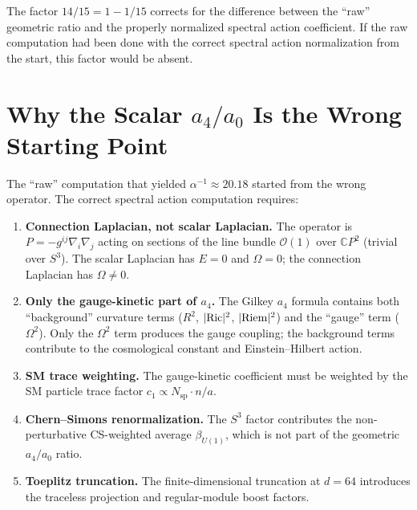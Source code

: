 \documentclass[12pt,a4paper]{article}
\theoremstyle{definition}
\begin{document}
The factor $14/15 = 1 - 1/15$ corrects for the difference between the
``raw'' geometric ratio and the properly normalized spectral action
coefficient.  If the raw computation had been done with the correct
spectral action normalization from the start, this factor would be absent.

\section{Why the Scalar $a_4/a_0$ Is the Wrong Starting Point}
\label{sec:wrong-starting-point}

The ``raw'' computation that yielded $\alpha^{-1} \approx 20.18$ started
from the wrong operator.  The correct spectral action computation requires:

\begin{enumerate}
\item \textbf{Connection Laplacian, not scalar Laplacian.}
  The operator is $P = -g^{ij}\nabla_i\nabla_j$ acting on sections of
  the line bundle $\mathcal{O}(1)$ over $\mathbb{C}P^2$ (trivial over
  $S^3$).  The scalar Laplacian has $E = 0$ and $\Omega = 0$; the
  connection Laplacian has $\Omega \neq 0$.

\item \textbf{Only the gauge-kinetic part of $a_4$.}
  The Gilkey $a_4$ formula contains both ``background'' curvature terms
  ($R^2$, $|{\rm Ric}|^2$, $|{\rm Riem}|^2$) and the ``gauge'' term
  ($\Omega^2$).  Only the $\Omega^2$ term produces the gauge coupling;
  the background terms contribute to the cosmological constant and
  Einstein--Hilbert action.

\item \textbf{SM trace weighting.}
  The gauge-kinetic coefficient must be weighted by the SM particle
  trace factor $c_1 \propto N_{\mathrm{sp}} \cdot n / a$.

\item \textbf{Chern--Simons renormalization.}
  The $S^3$ factor contributes the non-perturbative CS-weighted average
  $\beta_{U(1)}$, which is not part of the geometric $a_4/a_0$ ratio.

\item \textbf{Toeplitz truncation.}
  The finite-dimensional truncation at $d = 64$ introduces the traceless
  projection and regular-module boost factors.
\end{enumerate}
\end{document}
